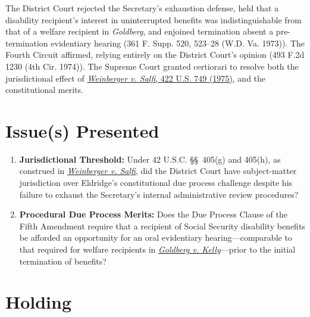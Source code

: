 \documentclass[12pt]{article}
\begin{document}
The District Court rejected the Secretary's exhaustion defense, held that a disability recipient's interest in uninterrupted benefits was indistinguishable from that of a welfare recipient in \emph{Goldberg}, and enjoined termination absent a pre-termination evidentiary hearing (361 F. Supp. 520, 523--28 (W.D. Va. 1973)). The Fourth Circuit affirmed, relying entirely on the District Court's opinion (493 F.2d 1230 (4th Cir. 1974)). The Supreme Court granted certiorari to resolve both the jurisdictional effect of \href{https://supreme.justia.com/cases/federal/us/422/749/}{\emph{Weinberger v. Salfi}, 422 U.S. 749 (1975)}, and the constitutional merits.

\section{Issue(s) Presented}

\begin{enumerate}
    \item \textbf{Jurisdictional Threshold:} Under 42 U.S.C. \S\S~405(g) and 405(h), as construed in \href{https://supreme.justia.com/cases/federal/us/422/749/}{\emph{Weinberger v. Salfi}}, did the District Court have subject-matter jurisdiction over Eldridge's constitutional due process challenge despite his failure to exhaust the Secretary's internal administrative review procedures?
    \item \textbf{Procedural Due Process Merits:} Does the Due Process Clause of the Fifth Amendment require that a recipient of Social Security disability benefits be afforded an opportunity for an oral evidentiary hearing---comparable to that required for welfare recipients in \href{https://supreme.justia.com/cases/federal/us/397/254/}{\emph{Goldberg v. Kelly}}---prior to the initial termination of benefits?
\end{enumerate}

\section{Holding}
\end{document}
